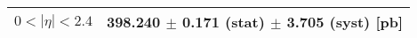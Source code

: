 \begin{tabular}{lc}
\hline
$0 < |\eta| <2.4$              & 398.240 $\pm$ 0.171 (stat) $\pm$ 3.705 (syst) [pb]  \\
\hline
\end{tabular}
